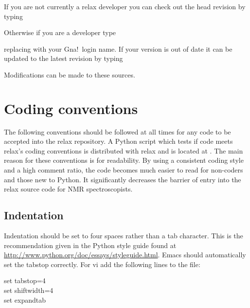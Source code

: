 If you are not currently a relax developer you can check out the head revision by typing


Otherwise if you are a developer type


replacing  with your Gna!\ login name.  If your version is out of date it can be updated to the latest revision by typing


Modifications can be made to these sources.




\section{Coding conventions}

The following conventions should be followed at all times for any code to be accepted into the relax repository.  A Python script which tests if code meets relax's coding conventions is distributed with relax and is located at .  The main reason for these conventions is for readability.  By using a consistent coding style and a high comment ratio, the code becomes much easier to read for non-coders and those new to Python.  It significantly decreases the barrier of entry into the relax source code for NMR spectroscopists.



\subsection{Indentation}

Indentation should be set to four spaces rather than a tab character.  This is the recommendation given in the Python style guide found at \href{http://www.python.org/doc/essays/styleguide.html}{http://www.python.org/doc/essays/styleguide.html}.  Emacs should automatically set the tabstop correctly.  For vi add the following lines to the  file:

\begin{exampleenv}
set tabstop=4 \\
set shiftwidth=4 \\
set expandtab
\end{exampleenv}

